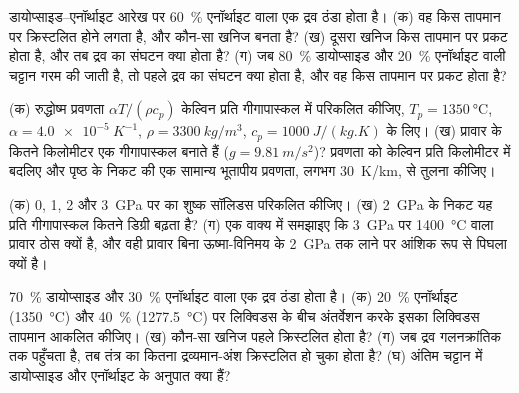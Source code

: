 \begin{exercise}[$\star$]\label{exo:b2:mantle-melting:2}
डायोप्साइड--एनॉर्थाइट आरेख पर \qty{60}{\percent} एनॉर्थाइट वाला एक द्रव
ठंडा होता है। (क) वह किस तापमान पर क्रिस्टलित होने लगता है, और कौन-सा खनिज
बनता है? (ख) दूसरा खनिज किस तापमान पर प्रकट होता है, और तब
द्रव का संघटन क्या होता है? (ग) जब
\qty{80}{\percent} डायोप्साइड और \qty{20}{\percent} एनॉर्थाइट वाली चट्टान गरम की जाती है, तो पहले द्रव का संघटन क्या होता है,
और वह किस तापमान पर प्रकट होता है?
\end{exercise}

\begin{exercise}[$\star$]\label{exo:b2:mantle-melting:3}
(क) रुद्धोष्म प्रवणता $\alpha T/(\rho c_p)$ केल्विन प्रति गीगापास्कल में परिकलित कीजिए,
$T_p = \qty{1350}{\celsius}$, $\alpha = \qty{4.0e-5}{K^{-1}}$, $\rho =
\qty{3300}{kg/m^3}$, $c_p = \qty{1000}{J/(kg.K)}$ के लिए। (ख) प्रावार के कितने किलोमीटर
एक गीगापास्कल बनाते हैं ($g = \qty{9.81}{m/s^2}$)? प्रवणता को केल्विन
प्रति किलोमीटर में बदलिए और पृष्ठ के निकट की एक सामान्य भूतापीय प्रवणता,
लगभग \qty{30}{K/km}, से तुलना कीजिए।
\end{exercise}

\begin{exercise}[$\star$]\label{exo:b2:mantle-melting:4}
(क) 0, 1, 2 और \qty{3}{GPa} पर  का शुष्क सॉलिडस परिकलित कीजिए। (ख)
\qty{2}{GPa} के निकट यह प्रति गीगापास्कल कितने डिग्री बढ़ता है? (ग) एक
वाक्य में समझाइए कि \qty{3}{GPa} पर \qty{1400}{\celsius} वाला प्रावार ठोस क्यों है, और
वही प्रावार बिना ऊष्मा-विनिमय के \qty{2}{GPa} तक लाने पर आंशिक रूप से पिघला क्यों है।
\end{exercise}

\begin{exercise}[$\star\star$]\label{exo:b2:mantle-melting:5}
\qty{70}{\percent} डायोप्साइड और \qty{30}{\percent} एनॉर्थाइट वाला एक द्रव ठंडा होता है।
(क) \qty{20}{\percent} एनॉर्थाइट (\qty{1350}{\celsius}) और \qty{40}{\percent}
(\qty{1277.5}{\celsius}) पर लिक्विडस के बीच अंतर्वेशन करके इसका लिक्विडस तापमान आकलित कीजिए।
(ख) कौन-सा खनिज पहले क्रिस्टलित होता है? (ग) जब द्रव गलनक्रांतिक तक पहुँचता है, तब
तंत्र का कितना द्रव्यमान-अंश क्रिस्टलित हो चुका होता है?
(घ) अंतिम चट्टान में डायोप्साइड और एनॉर्थाइट के अनुपात क्या हैं?
\end{exercise}

